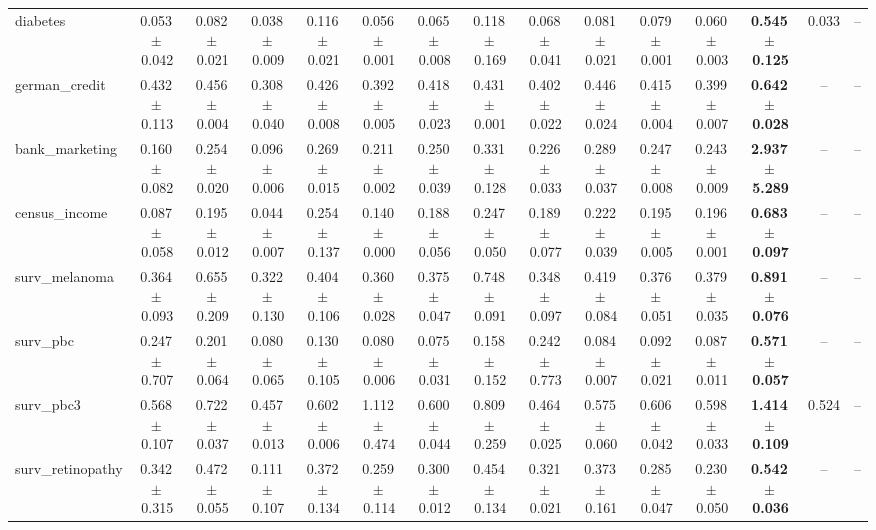 \documentclass[8pt]{extarticle}
\begin{document}
\begin{longtable}{l*{14}{c}}
diabetes & 0.053\,$\pm$\,0.042 & 0.082\,$\pm$\,0.021 & 0.038\,$\pm$\,0.009 & 0.116\,$\pm$\,0.021 & 0.056\,$\pm$\,0.001 & 0.065\,$\pm$\,0.008 & 0.118\,$\pm$\,0.169 & 0.068\,$\pm$\,0.041 & 0.081\,$\pm$\,0.021 & 0.079\,$\pm$\,0.001 & 0.060\,$\pm$\,0.003 & \textbf{0.545\,$\pm$\,0.125} & 0.033 & -- \\
german\_credit & 0.432\,$\pm$\,0.113 & 0.456\,$\pm$\,0.004 & 0.308\,$\pm$\,0.040 & 0.426\,$\pm$\,0.008 & 0.392\,$\pm$\,0.005 & 0.418\,$\pm$\,0.023 & 0.431\,$\pm$\,0.001 & 0.402\,$\pm$\,0.022 & 0.446\,$\pm$\,0.024 & 0.415\,$\pm$\,0.004 & 0.399\,$\pm$\,0.007 & \textbf{0.642\,$\pm$\,0.028} & -- & -- \\
bank\_marketing & 0.160\,$\pm$\,0.082 & 0.254\,$\pm$\,0.020 & 0.096\,$\pm$\,0.006 & 0.269\,$\pm$\,0.015 & 0.211\,$\pm$\,0.002 & 0.250\,$\pm$\,0.039 & 0.331\,$\pm$\,0.128 & 0.226\,$\pm$\,0.033 & 0.289\,$\pm$\,0.037 & 0.247\,$\pm$\,0.008 & 0.243\,$\pm$\,0.009 & \textbf{2.937\,$\pm$\,5.289} & -- & -- \\
census\_income & 0.087\,$\pm$\,0.058 & 0.195\,$\pm$\,0.012 & 0.044\,$\pm$\,0.007 & 0.254\,$\pm$\,0.137 & 0.140\,$\pm$\,0.000 & 0.188\,$\pm$\,0.056 & 0.247\,$\pm$\,0.050 & 0.189\,$\pm$\,0.077 & 0.222\,$\pm$\,0.039 & 0.195\,$\pm$\,0.005 & 0.196\,$\pm$\,0.001 & \textbf{0.683\,$\pm$\,0.097} & -- & -- \\
surv\_melanoma & 0.364\,$\pm$\,0.093 & 0.655\,$\pm$\,0.209 & 0.322\,$\pm$\,0.130 & 0.404\,$\pm$\,0.106 & 0.360\,$\pm$\,0.028 & 0.375\,$\pm$\,0.047 & 0.748\,$\pm$\,0.091 & 0.348\,$\pm$\,0.097 & 0.419\,$\pm$\,0.084 & 0.376\,$\pm$\,0.051 & 0.379\,$\pm$\,0.035 & \textbf{0.891\,$\pm$\,0.076} & -- & -- \\
surv\_pbc & 0.247\,$\pm$\,0.707 & 0.201\,$\pm$\,0.064 & 0.080\,$\pm$\,0.065 & 0.130\,$\pm$\,0.105 & 0.080\,$\pm$\,0.006 & 0.075\,$\pm$\,0.031 & 0.158\,$\pm$\,0.152 & 0.242\,$\pm$\,0.773 & 0.084\,$\pm$\,0.007 & 0.092\,$\pm$\,0.021 & 0.087\,$\pm$\,0.011 & \textbf{0.571\,$\pm$\,0.057} & -- & -- \\
surv\_pbc3 & 0.568\,$\pm$\,0.107 & 0.722\,$\pm$\,0.037 & 0.457\,$\pm$\,0.013 & 0.602\,$\pm$\,0.006 & 1.112\,$\pm$\,0.474 & 0.600\,$\pm$\,0.044 & 0.809\,$\pm$\,0.259 & 0.464\,$\pm$\,0.025 & 0.575\,$\pm$\,0.060 & 0.606\,$\pm$\,0.042 & 0.598\,$\pm$\,0.033 & \textbf{1.414\,$\pm$\,0.109} & 0.524 & -- \\
surv\_retinopathy & 0.342\,$\pm$\,0.315 & 0.472\,$\pm$\,0.055 & 0.111\,$\pm$\,0.107 & 0.372\,$\pm$\,0.134 & 0.259\,$\pm$\,0.114 & 0.300\,$\pm$\,0.012 & 0.454\,$\pm$\,0.134 & 0.321\,$\pm$\,0.021 & 0.373\,$\pm$\,0.161 & 0.285\,$\pm$\,0.047 & 0.230\,$\pm$\,0.050 & \textbf{0.542\,$\pm$\,0.036} & -- & -- \\

\end{longtable}
\end{document}
